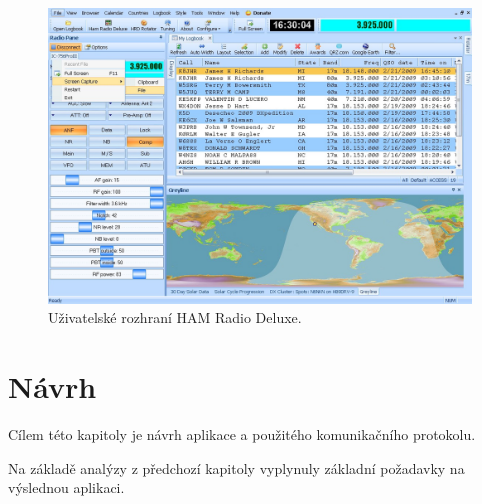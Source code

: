 \begin{figure}[h]
\centering
\includegraphics[trim=0cm 0cm 0cm 0cm, scale=0.33]{fig/hrd}
\caption{Uživatelské rozhraní HAM Radio Deluxe.}
\label{fig:FigureExample}
\end{figure}

\chapter{Návrh}
\label{navrh}

Cílem této kapitoly je návrh aplikace a použitého komunikačního protokolu.

Na základě analýzy z předchozí kapitoly vyplynuly základní požadavky
na výslednou aplikaci.

